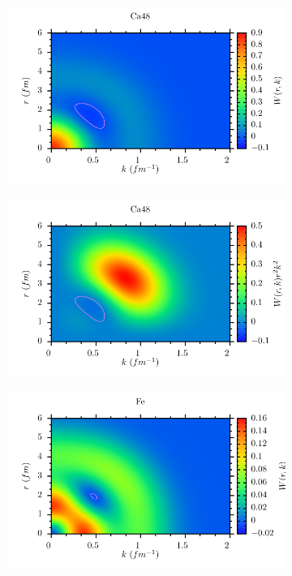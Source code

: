 \documentclass[11pt,twoside]{book}
\begin{document}
\begin{figure}
\centering
 \begin{subfigure}[b]{0.49\textwidth} 
 	\includegraphics[width=\textwidth]{./figuren/Ca48.pdf}  
 \end{subfigure} 
 \begin{subfigure}[b]{0.49\textwidth} 
 	\includegraphics[width=\textwidth]{./figuren/Ca48prob.pdf}  
 \end{subfigure} 
 \begin{subfigure}[b]{0.49\textwidth} 
 	\includegraphics[width=\textwidth]{./figuren/Fe.pdf}  

\end{subfigure}
\end{figure}
\end{document}
